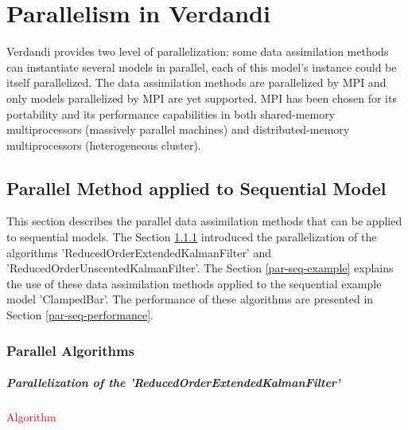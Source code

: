 \chapter{Parallelism in Verdandi}


Verdandi provides two level of parallelization: some data assimilation methods can instantiate several models in parallel, each of this model's instance could be itself parallelized. The data assimilation methods are parallelized by MPI and only models parallelized by MPI are yet supported. MPI has been chosen for its portability and its performance capabilities in both shared-memory multiprocessors (massively parallel machines) and distributed-memory multiprocessors (heterogeneous cluster).



\hypertarget{par-seq}{}\section{Parallel Method applied to Sequential Model}\label{par-seq}


This section describes the parallel data assimilation methods that can be applied to sequential models. The Section \ref{par-seq-algo} introduced the parallelization of the algorithms 'ReducedOrderExtendedKalmanFilter' \cite{Nerger-Thesis} and 'ReducedOrderUnscentedKalmanFilter'. The Section \ref{par-seq-example} explains  the use of these data assimilation methods applied to the sequential example model 'ClampedBar'. The performance of these algorithms are presented in Section \ref{par-seq-performance}.



\hypertarget{par-seq-algo}{}\subsection{Parallel Algorithms}\label{par-seq-algo}


\hypertarget{par-seq-algo-roekf}{}\paragraph{Parallelization of the 'ReducedOrderExtendedKalmanFilter'}\label{par-seq-algo-roekf}


\par \textcolor{red}{Algorithm}\\


